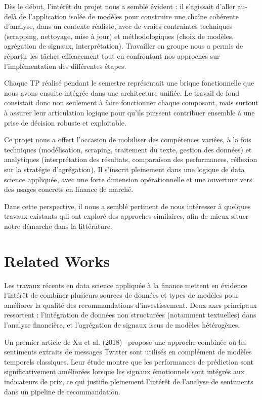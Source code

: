 \documentclass[a4paper,12pt]{article}
\begin{document}
Dès le début, l’intérêt du projet nous a semblé évident : il s’agissait d’aller au-delà de l'application isolée de modèles pour construire une chaîne cohérente d’analyse, dans un contexte réaliste, avec de vraies contraintes techniques (scrapping, nettoyage, mise à jour) et méthodologiques (choix de modèles, agrégation de signaux, interprétation). Travailler en groupe nous a permis de répartir les tâches efficacement tout en confrontant nos approches sur l’implémentation des différentes étapes.

Chaque TP réalisé pendant le semestre représentait une brique fonctionnelle que nous avons ensuite intégrée dans une architecture unifiée. Le travail de fond consistait donc non seulement à faire fonctionner chaque composant, mais surtout à assurer leur articulation logique pour qu’ils puissent contribuer ensemble à une prise de décision robuste et exploitable.

Ce projet nous a offert l’occasion de mobiliser des compétences variées, à la fois techniques (modélisation, scraping, traitement du texte, gestion des données) et analytiques (interprétation des résultats, comparaison des performances, réflexion sur la stratégie d’agrégation). Il s’inscrit pleinement dans une logique de data science appliquée, avec une forte dimension opérationnelle et une ouverture vers des usages concrets en finance de marché.

Dans cette perspective, il nous a semblé pertinent de nous intéresser à quelques travaux existants qui ont exploré des approches similaires, afin de mieux situer notre démarche dans la littérature.

\section{Related Works}

Les travaux récents en data science appliquée à la finance mettent en évidence l’intérêt de combiner plusieurs sources de données et types de modèles pour améliorer la qualité des recommandations d’investissement. Deux axes principaux ressortent : l’intégration de données non structurées (notamment textuelles) dans l’analyse financière, et l’agrégation de signaux issus de modèles hétérogènes.

Un premier article de Xu et al. (2018)~\cite{xu2018} propose une approche combinée où les sentiments extraits de messages Twitter sont utilisés en complément de modèles temporels classiques. Leur étude montre que les performances de prédiction sont significativement améliorées lorsque les signaux émotionnels sont intégrés aux indicateurs de prix, ce qui justifie pleinement l’intérêt de l’analyse de sentiments dans un pipeline de recommandation.
\end{document}
